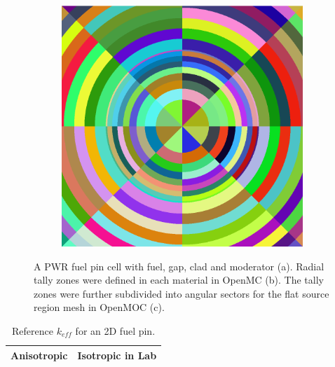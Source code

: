 \begin{figure}[h!]
\begin{subfigure}{.33\textwidth}
  \caption{}
\end{subfigure}
\begin{subfigure}{.33\textwidth}
  \centering
  \includegraphics[width=0.9\linewidth]{figures/biases/pin-cell/pin-cell-8x8}
  \caption{}
\end{subfigure}
\caption[Pin cell materials and geometry]{A PWR fuel pin cell with fuel, gap, clad and moderator (a). Radial tally zones were defined in each material in OpenMC (b). The tally zones were further subdivided into angular sectors for the flat source region mesh in OpenMOC (c).}
\label{fig:chap4-pin-cell}
\end{figure}

\begin{table}[h!]
  \centering
  \caption{Reference $k_{eff}$ for an 2D fuel pin.}
  \label{table:chap2-pin-reference} 
  \vspace{14pt}
  \begin{tabular}{c c}
  \toprule
  \multicolumn{1}{c}{\bf Anisotropic} &
  \multicolumn{1}{c}{\bf Isotropic in Lab} \\
  \midrule
  \bottomrule
\end{tabular}
\end{table}

